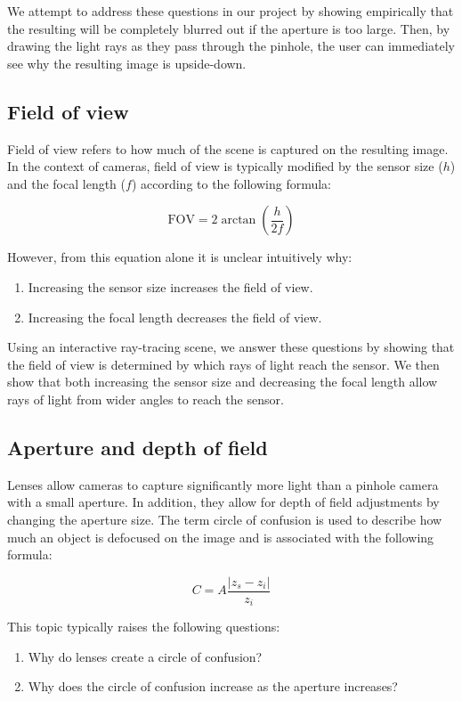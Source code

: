 \documentclass{acm_proc_article-sp}
\begin{document}
We attempt to address these questions in our project by showing empirically
that the resulting will be completely blurred out if the aperture is too large.
Then, by drawing the light rays as they pass through the pinhole, the user can
immediately see why the resulting image is upside-down.

\subsection{Field of view}

Field of view refers to how much of the scene is captured on the resulting
image. In the context of cameras, field of view is typically modified by the
sensor size ($ h $) and the focal length ($ f $) according to the following
formula:

\[ \text{FOV} = 2 \arctan \left(\frac{h}{2f}\right) \]

However, from this equation alone it is unclear intuitively why:

\begin{enumerate}
  \item Increasing the sensor size increases the field of view.
  \item Increasing the focal length decreases the field of view.
\end{enumerate}

Using an interactive ray-tracing scene, we answer these questions by showing
that the field of view is determined by which rays of light reach the sensor.
We then show that both increasing the sensor size and decreasing the focal
length allow rays of light from wider angles to reach the sensor.

\subsection{Aperture and depth of field}

Lenses allow cameras to capture significantly more light than a pinhole camera
with a small aperture. In addition, they allow for depth of field adjustments
by changing the aperture size. The term circle of confusion is used to describe
how much an object is defocused on the image and is associated with the
following formula:

\[ C = A \frac{|z_s - z_i|}{z_i} \]

This topic typically raises the following questions:

\begin{enumerate}
  \item Why do lenses create a circle of confusion?
  \item Why does the circle of confusion increase as the aperture increases?
\end{enumerate}
\end{document}
